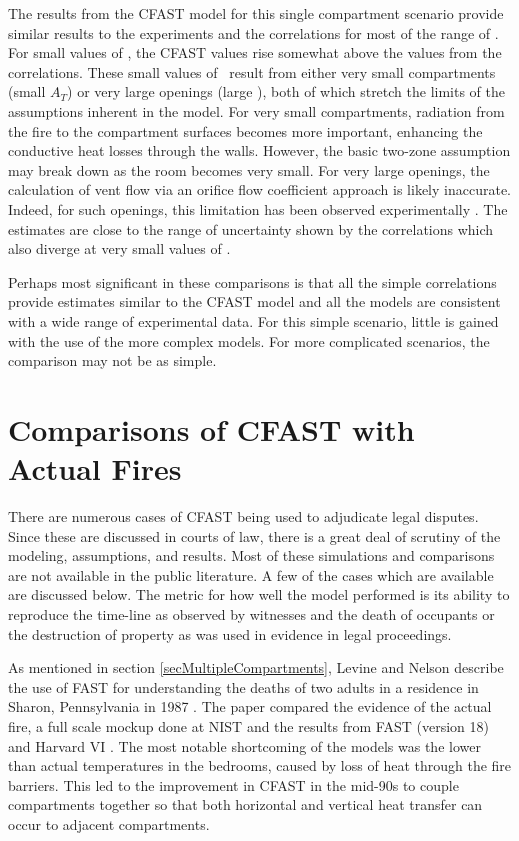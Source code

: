 The results from the CFAST model for this single compartment scenario provide similar results to the experiments and the correlations for most of the range of \asqh. For small values of \asqh, the CFAST values rise somewhat above the values from the correlations. These small values of \asqh \, result from either very small compartments (small $A_T$) or very large openings (large \asqh), both of which stretch the limits of the assumptions inherent in the model. For very small compartments, radiation from the fire to the compartment surfaces becomes more important, enhancing the conductive heat losses through the walls. However, the basic two-zone assumption may break down as the room becomes very small. For very large openings, the calculation of vent flow via an orifice flow coefficient approach is likely inaccurate. Indeed, for such openings, this limitation has been observed experimentally \cite{Valid:Babrauskas_Flashover}. The estimates are close to the range of uncertainty shown by the correlations which also diverge at very small values of \asqh.

Perhaps most significant in these comparisons is that all the simple correlations provide estimates similar to the CFAST model and all the models are consistent with a wide range of experimental data. For this simple scenario, little is gained with the use of the more complex models. For more complicated scenarios, the comparison may not be as simple.

\section{Comparisons of CFAST with Actual Fires}

There are numerous cases of CFAST being used to adjudicate legal disputes. Since these are discussed in courts of law, there is a great deal of scrutiny of the modeling, assumptions, and results. Most of these simulations and comparisons are not available in the public literature. A few of the cases which are available are discussed below. The metric for how well the model performed is its ability to reproduce the time-line as observed by witnesses and the death of occupants or the destruction of property as was used in evidence in legal proceedings.

As mentioned in section \ref{secMultipleCompartments}, Levine and Nelson describe the use of FAST for understanding the deaths of two adults in a residence in Sharon, Pennsylvania in 1987 \cite{Valid:Levine}. The paper compared the evidence of the actual fire, a full scale mockup done at NIST and the results from FAST (version 18) \cite{Jones:1985} and Harvard VI \cite{Rockett:1985}. The most notable shortcoming of the models was the lower than actual temperatures in the bedrooms, caused by loss of heat through the fire barriers. This led to the improvement in CFAST in the mid-90s to couple compartments together so that both horizontal and vertical heat transfer can occur to adjacent compartments.

